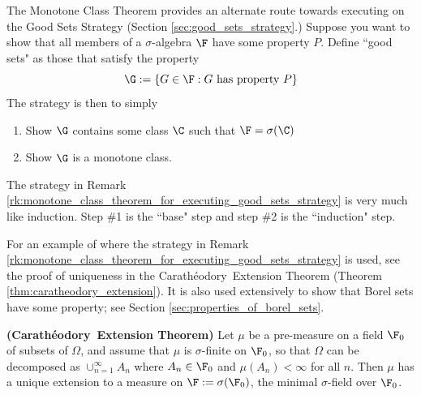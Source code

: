 \documentclass{article} %
\newcommand{\Caratheodory}{Carath\'eodory}
\begin{document}
\begin{remark}{}
The Monotone Class Theorem provides an alternate route towards executing on the Good Sets Strategy (Section \ref{sec:good_sets_strategy}.)  Suppose you want to show that all members of a $\sigma$-algebra   $\F$ have some property $P$.  Define ``good sets" as those that satisfy the property
\[ \G := \{ G \in \F : G \text{ has property } P \} \]
The strategy is then to simply
\begin{enumerate}
\item Show $\G$ contains some class $\C$ such that $\F = \sigma(\C)$
\item Show $\G$ is a monotone class.  
\end{enumerate}	 
\label{rk:monotone_class_theorem_for_executing_good_sets_strategy}
\end{remark}

\begin{remark}
The strategy in Remark \ref{rk:monotone_class_theorem_for_executing_good_sets_strategy} is very much like induction.  Step \#1 is the ``base" step and step \#2 is the ``induction" step.
\end{remark}

For an example of where the strategy in Remark \ref{rk:monotone_class_theorem_for_executing_good_sets_strategy} is used, see the proof of uniqueness in the \Caratheodory~Extension Theorem (Theorem \ref{thm:caratheodory_extension}).  It is also used extensively to show that Borel sets have some property; see Section \ref{sec:properties_of_borel_sets}.


\begin{theorem}{\textbf{(\Caratheodory~Extension Theorem)}} Let $\mu$ be a pre-measure on a field $\F_0$ of subsets of $\Omega$, and assume that $\mu$ is $\sigma$-finite on $\F_0$, so that $\Omega$ can be decomposed as $\cup_{n=1}^\infty A_n$ where $A_n \in \F_0$ and $\mu(A_n) < \infty$ for all $n$.  Then $\mu$ has a unique extension to a measure on $\F := \sigma(\F_0)$, the minimal $\sigma$-field over $\F_0$. 
 \label{thm:caratheodory_extension}
\end{theorem}
\end{document}
